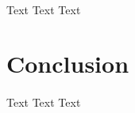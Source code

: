 \documentclass[a4paper]{article}
\begin{document}
\paragraph{}
Text Text Text

%
\section{Conclusion}

\paragraph{}
Text Text Text

\clearpage


%

%

%
%
\end{document}
